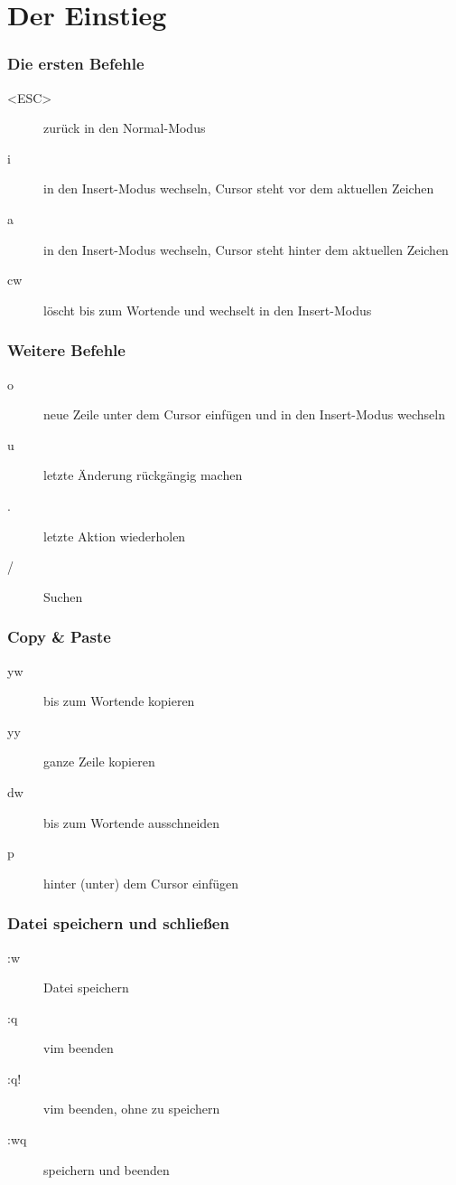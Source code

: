 \documentclass[aspectratio=1610,svgnames]{beamer}
\newcommand{\divider}[1]{\begin{frame} %
\begin{alertblock}{} %
\centering\usebeamerfont{section title}#1 %
\end{alertblock} %
\end{frame}}
\begin{document}
\section{Der Einstieg}
\divider{\insertsection}
\begin{frame}[<+->]
    \frametitle{Die ersten Befehle}
    \begin{description}
        \item[<ESC>] zurück in den Normal-Modus
        \item[i] in den Insert-Modus wechseln, Cursor steht vor dem aktuellen Zeichen
        \item[a] in den Insert-Modus wechseln, Cursor steht hinter dem aktuellen Zeichen
        \item[cw] löscht bis zum Wortende und wechselt in den Insert-Modus
    \end{description}
\end{frame}
\begin{frame}[<+->]
    \frametitle{Weitere Befehle}
    \begin{description}
        \item[o] neue Zeile unter dem Cursor einfügen und in den Insert-Modus wechseln
        \item[u] letzte Änderung rückgängig machen
        \item[.] letzte Aktion wiederholen
        \item[/] Suchen
    \end{description}
\end{frame}
\begin{frame}[<+->]
    \frametitle{Copy \& Paste}
    \begin{description}
        \item[yw] bis zum Wortende kopieren
        \item[yy] ganze Zeile kopieren
        \item[dw] bis zum Wortende ausschneiden
        \item[p] hinter (unter) dem Cursor einfügen
    \end{description}
\end{frame}
\begin{frame}[<+->]
    \frametitle{Datei speichern und schließen}
    \begin{description}
        \item[:w] Datei speichern
        \item[:q] vim beenden
        \item[:q!] vim beenden, ohne zu speichern
        \item[:wq] speichern und beenden
    \end{description}
\end{frame}
\end{document}
